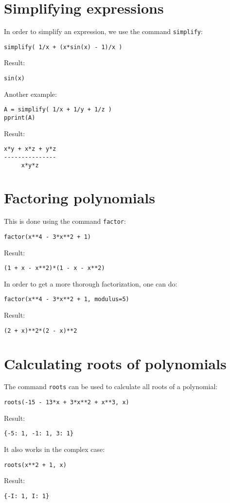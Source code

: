\documentclass[article,A4,12pt]{llncs}
\begin{document}
\section{Simplifying expressions}

In order to simplify an expression, we use the command {\tt simplify}:
\begin{verbatim}
simplify( 1/x + (x*sin(x) - 1)/x )
\end{verbatim}
Result:
\begin{verbatim}
sin(x)
\end{verbatim}
Another example:
\begin{verbatim}
A = simplify( 1/x + 1/y + 1/z )
pprint(A)
\end{verbatim}
Result:
\begin{verbatim}
x*y + x*z + y*z
---------------
     x*y*z     
\end{verbatim}

\section{Factoring polynomials}

This is done using the command {\tt factor}:
\begin{verbatim}
factor(x**4 - 3*x**2 + 1)
\end{verbatim}
Result:
\begin{verbatim}
(1 + x - x**2)*(1 - x - x**2)
\end{verbatim}
In order to get a more thorough factorization, one can do:
\begin{verbatim}
factor(x**4 - 3*x**2 + 1, modulus=5)
\end{verbatim}
Result:
\begin{verbatim}
(2 + x)**2*(2 - x)**2
\end{verbatim}


\section{Calculating roots of polynomials}

The command {\tt roots} can be used to calculate all roots of a polynomial:
\begin{verbatim}
roots(-15 - 13*x + 3*x**2 + x**3, x)
\end{verbatim}
Result:
\begin{verbatim}
{-5: 1, -1: 1, 3: 1}
\end{verbatim}
It also works in the complex case:
\begin{verbatim}
roots(x**2 + 1, x)
\end{verbatim}
Result:
\begin{verbatim}
{-I: 1, I: 1}
\end{verbatim}
\end{document}
